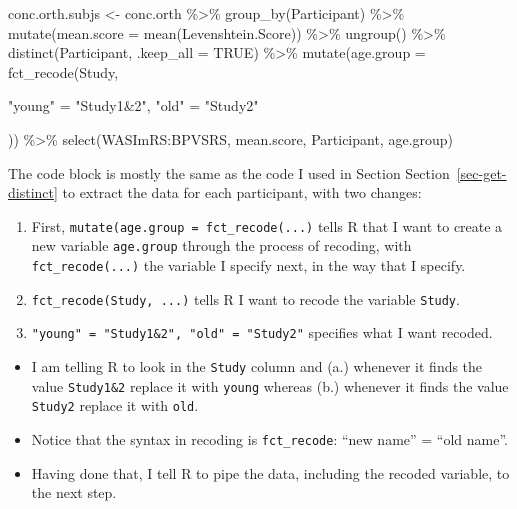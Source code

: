 \documentclass[
  letterpaper,
  DIV=11,
  numbers=noendperiod]{scrreprt}
\newenvironment{Shaded}{\begin{snugshade}}{\end{snugshade}}
\newcommand{\AttributeTok}[1]{\textcolor[rgb]{0.40,0.45,0.13}{#1}}
\newcommand{\ConstantTok}[1]{\textcolor[rgb]{0.56,0.35,0.01}{#1}}
\newcommand{\FunctionTok}[1]{\textcolor[rgb]{0.28,0.35,0.67}{#1}}
\newcommand{\NormalTok}[1]{\textcolor[rgb]{0.00,0.23,0.31}{#1}}
\newcommand{\OtherTok}[1]{\textcolor[rgb]{0.00,0.23,0.31}{#1}}
\newcommand{\SpecialCharTok}[1]{\textcolor[rgb]{0.37,0.37,0.37}{#1}}
\newcommand{\StringTok}[1]{\textcolor[rgb]{0.13,0.47,0.30}{#1}}
\providecommand{\tightlist}{%
  \setlength{\itemsep}{0pt}\setlength{\parskip}{0pt}}\usepackage{longtable,booktabs,array}
\begin{document}
\begin{Shaded}
\begin{Highlighting}[]
\NormalTok{conc.orth.subjs }\OtherTok{\textless{}{-}}\NormalTok{ conc.orth }\SpecialCharTok{\%\textgreater{}\%}
  \FunctionTok{group\_by}\NormalTok{(Participant) }\SpecialCharTok{\%\textgreater{}\%}
  \FunctionTok{mutate}\NormalTok{(}\AttributeTok{mean.score =} \FunctionTok{mean}\NormalTok{(Levenshtein.Score)) }\SpecialCharTok{\%\textgreater{}\%}
  \FunctionTok{ungroup}\NormalTok{() }\SpecialCharTok{\%\textgreater{}\%}
  \FunctionTok{distinct}\NormalTok{(Participant, }\AttributeTok{.keep\_all =} \ConstantTok{TRUE}\NormalTok{) }\SpecialCharTok{\%\textgreater{}\%}
  \FunctionTok{mutate}\NormalTok{(}\AttributeTok{age.group =} \FunctionTok{fct\_recode}\NormalTok{(Study,}
    
    \StringTok{"young"} \OtherTok{=} \StringTok{"Study1\&2"}\NormalTok{,}
    \StringTok{"old"} \OtherTok{=} \StringTok{"Study2"}
    
\NormalTok{  )) }\SpecialCharTok{\%\textgreater{}\%}
  \FunctionTok{select}\NormalTok{(WASImRS}\SpecialCharTok{:}\NormalTok{BPVSRS, mean.score, Participant, age.group)}
\end{Highlighting}
\end{Shaded}

The code block is mostly the same as the code I used in Section
Section~\ref{sec-get-distinct} to extract the data for each participant,
with two changes:

\begin{enumerate}
\def\labelenumi{\arabic{enumi}.}
\tightlist
\item
  First, \texttt{mutate(age.group\ =\ fct\_recode(...)} tells R that I
  want to create a new variable \texttt{age.group} through the process
  of recoding, with \texttt{fct\_recode(...)} the variable I specify
  next, in the way that I specify.
\item
  \texttt{fct\_recode(Study,\ ...)} tells R I want to recode the
  variable \texttt{Study}.
\item
  \texttt{"young"\ =\ "Study1\&2",\ "old"\ =\ "Study2"} specifies what I
  want recoded.
\end{enumerate}

\begin{itemize}
\tightlist
\item
  I am telling R to look in the \texttt{Study} column and (a.) whenever
  it finds the value \texttt{Study1\&2} replace it with \texttt{young}
  whereas (b.) whenever it finds the value \texttt{Study2} replace it
  with \texttt{old}.
\item
  Notice that the syntax in recoding is \texttt{fct\_recode}: ``new
  name'' = ``old name''.
\item
  Having done that, I tell R to pipe the data, including the recoded
  variable, to the next step.
\end{itemize}
\end{document}

